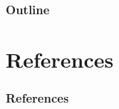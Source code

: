 

\frame{\titlepage}

\begin{frame}
    \frametitle{Outline}
    \tableofcontents
\end{frame}

\section{References}

\begin{frame}[allowframebreaks]
    \frametitle{References}
    \printbibliography
\end{frame}


